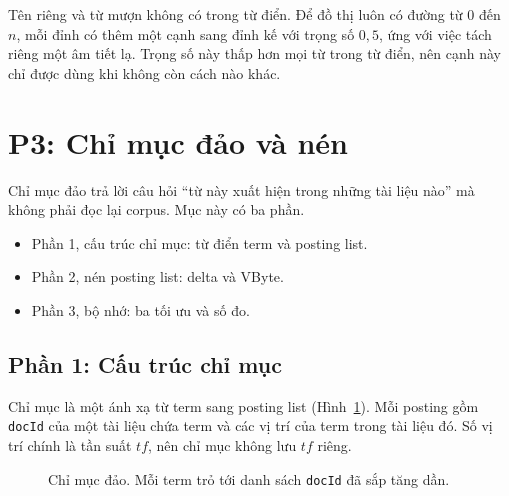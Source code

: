 \documentclass[9pt,twocolumn,a4paper]{extarticle}
\newcommand{\code}[1]{\texttt{#1}}
\newcommand{\srcref}[1]{\par\noindent\fcolorbox{red}{white}{\footnotesize\textbf{Mã nguồn: Listing~\ref{#1} (Phụ lục~\ref{app:code}).}}\par\vspace{3pt}}
\begin{document}
Tên riêng và từ mượn không có trong từ điển. Để đồ thị luôn có đường từ 0 đến $n$, mỗi đỉnh có thêm một cạnh sang đỉnh kế với trọng số $0{,}5$, ứng với việc tách riêng một âm tiết lạ. Trọng số này thấp hơn mọi từ trong từ điển, nên cạnh này chỉ được dùng khi không còn cách nào khác.

\srcref{lst:segment}

\section{P3: Chỉ mục đảo và nén}
\label{chap:p3}
Chỉ mục đảo trả lời câu hỏi ``từ này xuất hiện trong những tài liệu nào'' mà không phải đọc lại corpus. Mục này có ba phần.
\begin{itemize}\itemsep0pt
\item Phần 1, cấu trúc chỉ mục: từ điển term và posting list.
\item Phần 2, nén posting list: delta và VByte.
\item Phần 3, bộ nhớ: ba tối ưu và số đo.
\end{itemize}

\subsection{Phần 1: Cấu trúc chỉ mục}
\label{sec:index}
Chỉ mục là một ánh xạ từ term sang posting list (Hình~\ref{fig:inverted}). Mỗi posting gồm \code{docId} của một tài liệu chứa term và các vị trí của term trong tài liệu đó. Số vị trí chính là tần suất $tf$, nên chỉ mục không lưu $tf$ riêng.

\begin{figure}[H]
\centering
{}
\caption{Chỉ mục đảo. Mỗi term trỏ tới danh sách \code{docId} đã sắp tăng dần.}
\label{fig:inverted}
\end{figure}
\end{document}
